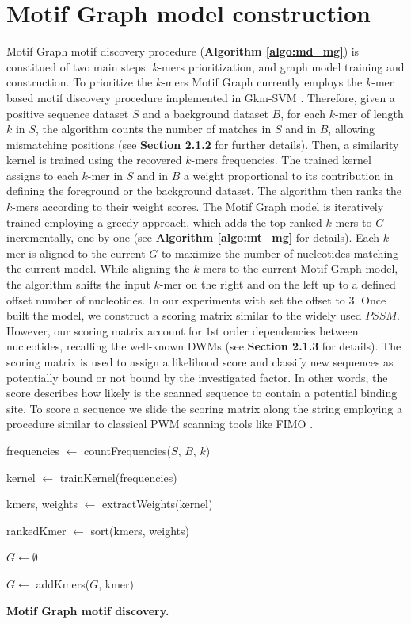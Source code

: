 \documentclass[a4paper, titlepage, openright]{book}
\begin{document}
\section{Motif Graph model construction}
Motif Graph motif discovery procedure (\textbf{Algorithm \ref{algo:md_mg}}) is constitued of two main steps: $k$-mers prioritization, and graph model training and construction. To prioritize the $k$-mers Motif Graph currently employs the $k$-mer based motif discovery procedure implemented in Gkm-SVM \citep{ghandi2014enhanced}. Therefore, given a positive sequence dataset $S$ and a background dataset $B$, for each $k$-mer of length $k$ in $S$, the algorithm counts the number of matches in $S$ and in $B$, allowing mismatching positions (see \textbf{Section 2.1.2} for further details). Then, a similarity kernel is trained using the recovered $k$-mers frequencies. The trained kernel assigns to each $k$-mer in $S$ and in $B$ a weight proportional to its contribution in defining the foreground or the background dataset. The algorithm then ranks the $k$-mers according to their weight scores. The Motif Graph model is iteratively trained employing a greedy approach, which adds the top ranked $k$-mers to $G$ incrementally, one by one (see \textbf{Algorithm \ref{algo:mt_mg}} for details). Each $k$-mer is aligned to the current $G$ to maximize the number of nucleotides matching the current model. While aligning the $k$-mers to the current Motif Graph model, the algorithm shifts the input $k$-mer on the right and on the left up to a defined offset number of nucleotides. In our experiments with set the offset to $3$. Once built the model, we construct a scoring matrix similar to the widely used $PSSM$. However, our scoring matrix account for $1$st order dependencies between nucleotides, recalling the well-known DWMs (see \textbf{Section 2.1.3} for details). The scoring matrix is used to assign a likelihood score and classify new sequences as potentially bound or not bound by the investigated factor. In other words, the score describes how likely is the scanned sequence to contain a potential binding site. To score a sequence we slide the scoring matrix along the string employing a procedure similar to classical PWM scanning tools like FIMO \citep{grant2011fimo}.
\begin{algorithm}
	\DontPrintSemicolon

	frequencies $\gets$ countFrequencies($S$, $B$, $k$)

	kernel $\gets$ trainKernel(frequencies)

	kmers, weights $\gets$ extractWeights(kernel)

	rankedKmer $\gets$ sort(kmers, weights)

	$G \gets \emptyset$

	{
		$G \gets$ addKmers($G$, kmer)
	}

	\caption{\textbf{Motif Graph motif discovery.}}
	\label{algo:md_mg}
\end{algorithm}
\end{document}
